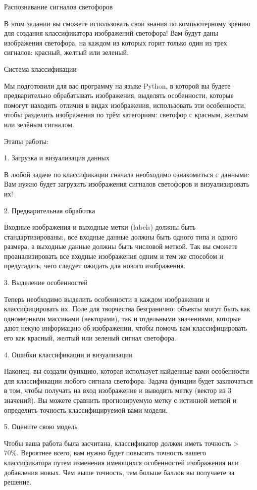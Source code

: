 \assignementTitle{}{}

Распознавание сигналов светофоров

В этом задании вы сможете использовать свои знания по компьютерному зрению для создания классификатора изображений светофора! Вам будут даны изображения светофора, на каждом из которых горит только один из трех сигналов: красный, желтый или зеленый.

Система классификации

Мы подготовили для вас программу на языке Python, в которой вы будете предварительно обрабатывать изображения, выделять особенности, которые помогут находить отличия в видах изображения, использовать эти особенности, чтобы разделить изображения по трём категориям: светофор с красным, желтым или зелёным сигналом.

Этапы работы:

1. Загрузка и визуализация данных

В любой задаче по классификации сначала необходимо ознакомиться с данными: Вам нужно будет загрузить изображения сигналов светофоров и визуализировать их!

2. Предварительная обработка

Входные изображения и выходные метки (labels) должны быть стандартизированы:, все входные данные должны быть одного типа и одного размера, а выходные данные должны быть числовой меткой. Так вы сможете проанализировать все входные изображения одним и тем же способом и предугадать, чего следует ожидать для нового изображения.

3. Выделение особенностей

Теперь необходимо выделить особенности в каждом изображении и классифицировать их. Поле для творчества безгранично: объекты могут быть как одномерными массивами (векторами), так и отдельными значениями, которые дают некую информацию об изображении, чтобы помочь вам классифицировать его как красный, желтый или зеленый сигнал светофора. 


4. Ошибки классификации и визуализации

Наконец, вы создали функцию, которая использует найденные вами особенности для классификации любого сигнала светофора. Задача функции будет заключаться в том, чтобы получать на вход изображение и выводить метку (вектор из 3 значений). Вы можете сравнить прогнозируемую метку с истинной меткой и определить точность классифицируемой вами модели.

5. Оцените свою модель

Чтобы ваша работа была засчитана, классификатор должен иметь точность > 70\%. Вероятнее всего, вам нужно будет повысить точность вашего классификатора путем изменения имеющихся особенностей изображения или добавления новых. Чем выше точность, тем больше баллов вы получаете за решение.
